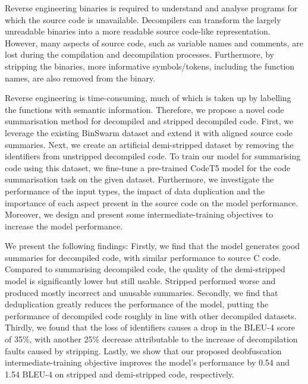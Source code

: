 Reverse engineering binaries is required to understand and analyse programs for which the source code is unavailable. Decompilers can transform the largely unreadable binaries into a more readable source code-like representation. However, many aspects of source code, such as variable names and comments, are lost during the compilation and decompilation processes. Furthermore, by stripping the binaries, more informative symbols/tokens, including the function names, are also removed from the binary.

Reverse engineering is time-consuming, much of which is taken up by labelling the functions with semantic information. Therefore, we propose a novel code summarisation method for decompiled and stripped decompiled code. First, we leverage the existing BinSwarm dataset and extend it with aligned source code summaries. Next, we create an artificial demi-stripped dataset by removing the identifiers from unstripped decompiled code. To train our model for summarising code using this dataset, we fine-tune a pre-trained CodeT5 model for the code summarisation task on the given dataset. Furthermore, we investigate the performance of the input types, the impact of data duplication and the importance of each aspect present in the source code on the model performance. Moreover, we design and present some intermediate-training objectives to increase the model performance.

We present the following findings: 
Firstly, we find that the model generates good summaries for decompiled code, with similar performance to source C code. Compared to summarising decompiled code, the quality of the demi-stripped model is significantly lower but still usable. Stripped performed worse and produced mostly incorrect and unusable summaries. 
Secondly, we find that deduplication greatly reduces the performance of the model, putting the performance of decompiled code roughly in line with other decompiled datasets. Thirdly, we found that the loss of identifiers causes a drop in the BLEU-4 score of 35\%, with another 25\% decrease attributable to the increase of decompilation faults caused by stripping. Lastly, we show that our proposed deobfuscation intermediate-training objective improves the model's performance by 0.54 and 1.54  BLEU-4 on stripped and demi-stripped code, respectively.